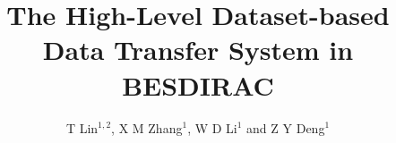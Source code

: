 \documentclass[a4paper]{jpconf}
\begin{document}
\title{The High-Level Dataset-based Data Transfer System in BESDIRAC}

\author{T Lin$^{1,2}$, X M Zhang$^1$, W D Li$^1$ and Z Y Deng$^1$}
\address{$^1$ Institute of High Energy Physics, 
            19B Yuquan Road,
            Beijing 100049,
            People's Republic of China}
\address{$^2$ University of Chinese Academy Sciences,
            19A Yuquan Road,
            Beijing 100049,
            People's Republic of China}












\end{document}
